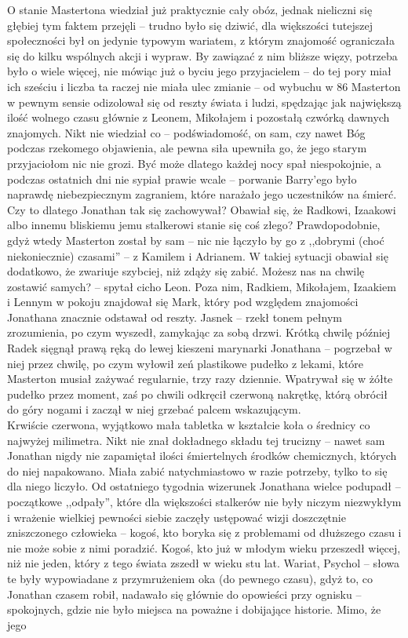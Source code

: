 \documentclass[../MAIN.tex]{subfiles}
\begin{document}
O stanie Mastertona wiedział już praktycznie cały obóz, jednak nieliczni się głębiej tym faktem przejęli -- trudno było się dziwić, dla większości tutejszej społeczności był on jedynie typowym wariatem, z którym znajomość ograniczała się do kilku wspólnych akcji i wypraw. By zawiązać z nim bliższe więzy, potrzeba było o wiele więcej, nie mówiąc już o byciu jego przyjacielem -- do tej pory miał ich sześciu i liczba ta raczej nie miała ulec zmianie -- od wybuchu w 86 Masterton w pewnym sensie odizolował się od reszty świata i ludzi, spędzając jak największą ilość wolnego czasu głównie z Leonem, Mikołajem i pozostałą czwórką dawnych znajomych. Nikt nie wiedział co -- podświadomość, on sam, czy nawet Bóg podczas rzekomego objawienia, ale pewna siła upewniła go, że jego starym przyjaciołom nic nie grozi. Być może dlatego każdej nocy spał niespokojnie, a podczas ostatnich dni nie sypiał prawie wcale -- porwanie Barry’ego było naprawdę niebezpiecznym zagraniem, które narażało jego uczestników na śmierć. Czy to 
dlatego Jonathan tak się zachowywał? Obawiał się, że Radkowi, Izaakowi albo innemu bliskiemu jemu stalkerowi stanie się coś złego? Prawdopodobnie, gdyż wtedy Masterton został by sam -- nic nie łączyło by go z ,,dobrymi (choć niekoniecznie) czasami'' -- z Kamilem i Adrianem. W takiej sytuacji obawiał się dodatkowo, że zwariuje szybciej, niż zdąży się zabić.
\sx Możesz nas na chwilę zostawić samych? -- spytał cicho Leon. Poza nim, Radkiem, Mikołajem, Izaakiem i Lennym w pokoju znajdował się Mark, który pod względem znajomości Jonathana znacznie odstawał od reszty.
\xx Jasne\3k -- rzekł tonem pełnym zrozumienia, po czym wyszedł, zamykając za sobą drzwi.
\qd
Krótką chwilę później Radek sięgnął prawą ręką do lewej kieszeni marynarki Jonathana -- pogrzebał w niej przez chwilę, po czym wyłowił zeń plastikowe pudełko z lekami, które Masterton musiał zażywać regularnie, trzy razy dziennie. Wpatrywał się w żółte pudełko przez moment, zaś po chwili odkręcił czerwoną nakrętkę, którą obrócił do góry nogami i zaczął w niej grzebać palcem wskazującym.\\
Krwiście czerwona, wyjątkowo mała tabletka w kształcie koła o średnicy co najwyżej milimetra. Nikt nie znał dokładnego składu tej trucizny -- nawet sam Jonathan nigdy nie zapamiętał ilości śmiertelnych środków chemicznych, których do niej napakowano. Miała zabić natychmiastowo w razie potrzeby, tylko to się dla niego liczyło. Od ostatniego tygodnia wizerunek Jonathana wielce podupadł -- początkowe ,,odpały'', które dla większości stalkerów nie były niczym niezwykłym i wrażenie wielkiej pewności siebie zaczęły ustępować wizji doszczętnie zniszczonego człowieka -- kogoś, kto boryka się z problemami od dłuższego czasu i nie może sobie z nimi poradzić. Kogoś, kto już w młodym wieku przeszedł więcej, niż nie jeden, który z tego świata zszedł w wieku stu lat. Wariat, Psychol -- słowa te były wypowiadane z przymrużeniem oka (do pewnego czasu), gdyż to, co Jonathan czasem robił, nadawało się głównie do opowieści przy ognisku -- spokojnych, gdzie nie było miejsca na poważne i dobijające historie. Mimo, że jego
\end{document}

